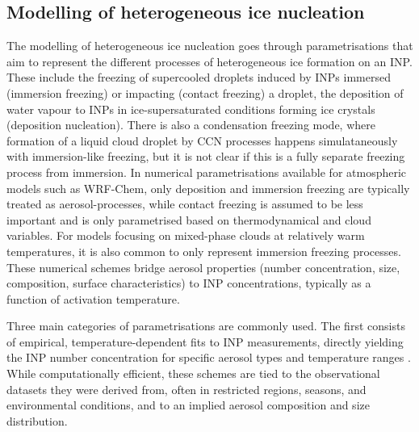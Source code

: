     \subsection{Modelling of heterogeneous ice nucleation}
    \label{sec:modelling_hetero_nuc}
    The modelling of heterogeneous ice nucleation goes through parametrisations that aim to represent the different processes of heterogeneous ice formation on an INP. These include the freezing of supercooled droplets induced by INPs immersed (immersion freezing) or impacting (contact freezing) a droplet, the deposition of water vapour to INPs  in ice-supersaturated conditions forming ice crystals (deposition nucleation). There is also a condensation freezing mode, where formation of a liquid cloud droplet by CCN processes happens simulataneously with immersion-like freezing, but it is not clear if this is a fully separate freezing process from immersion.
    In numerical parametrisations available for atmospheric models such as WRF-Chem, only deposition and immersion freezing are typically treated as aerosol-processes, while contact freezing is assumed to be less important and is only parametrised based on thermodynamical and cloud variables. For models focusing on mixed-phase clouds at relatively warm temperatures, it is also common to only represent immersion freezing processes.
    These numerical schemes bridge aerosol properties (number concentration, size, composition, surface characteristics) to INP concentrations, typically as a function of activation temperature.

Three main categories of parametrisations are commonly used. The first consists of empirical, temperature-dependent fits to INP measurements, directly yielding the INP number concentration for specific aerosol types and temperature ranges \citep[e.g.][]{demott_predicting_2010, demott_integrating_2015, wilson_marine_2015, li_predicting_2022}. While computationally efficient, these schemes are tied to the observational datasets they were derived from, often in restricted regions, seasons, and environmental conditions, and to an implied aerosol composition and size distribution.

